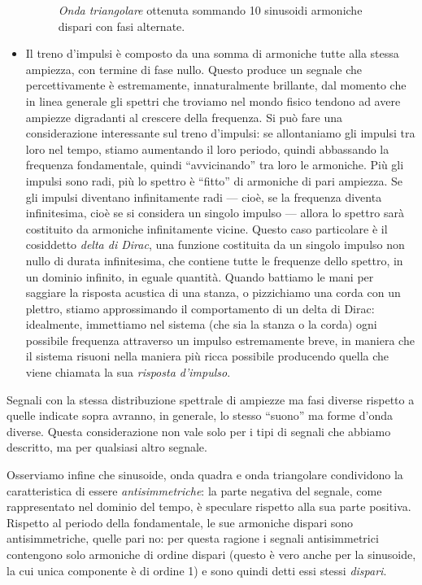 \begin{itemize}
\begin{figure}
    \begin{center}
       \scalebox{0.6} {}
    \end{center}
    \caption{\emph{Onda triangolare} ottenuta sommando 10 sinusoidi armoniche dispari con fasi alternate.}
\end{figure}

\item Il treno d'impulsi è composto da una somma di armoniche tutte alla stessa ampiezza, con termine di fase nullo. Questo produce un segnale che percettivamente è estremamente, innaturalmente brillante, dal momento che in linea generale gli spettri che troviamo nel mondo fisico tendono ad avere ampiezze digradanti al crescere della frequenza. Si può fare una considerazione interessante sul treno d'impulsi: se allontaniamo gli impulsi tra loro nel tempo, stiamo aumentando il loro periodo, quindi abbassando la frequenza fondamentale, quindi ``avvicinando'' tra loro le armoniche. Più gli impulsi sono radi, più lo spettro è ``fitto'' di armoniche di pari ampiezza. Se gli impulsi diventano infinitamente radi --- cioè, se la frequenza diventa infinitesima, cioè se si considera un singolo impulso --- allora lo spettro sarà costituito da armoniche infinitamente vicine. Questo caso particolare è il cosiddetto \emph{delta di Dirac}, una funzione costituita da un singolo impulso non nullo di durata infinitesima, che contiene tutte le frequenze dello spettro, in un dominio infinito, in eguale quantità. Quando battiamo le mani per saggiare la risposta acustica di una stanza, o pizzichiamo una corda con un plettro, stiamo approssimando il comportamento di un delta di Dirac: idealmente, immettiamo nel sistema (che sia la stanza o la corda) ogni possibile frequenza attraverso un impulso estremamente breve, in maniera che il sistema risuoni nella maniera più ricca possibile producendo quella che viene chiamata la sua \emph{risposta d'impulso}.

\end{itemize}

Segnali con la stessa distribuzione spettrale di ampiezze ma fasi diverse rispetto a quelle indicate sopra avranno, in generale, lo stesso ``suono'' ma forme d'onda diverse. Questa considerazione non vale solo per i tipi di segnali che abbiamo descritto, ma per qualsiasi altro segnale.

Osserviamo infine che sinusoide, onda quadra e onda triangolare condividono la caratteristica di essere \emph{antisimmetriche}: la parte negativa del segnale, come rappresentato nel dominio del tempo, è speculare rispetto alla sua parte positiva. Rispetto al periodo della fondamentale, le sue armoniche dispari sono antisimmetriche, quelle pari no: per questa ragione i segnali antisimmetrici contengono solo armoniche di ordine dispari (questo è vero anche per la sinusoide, la cui unica componente è di ordine 1) e sono quindi detti essi stessi \emph{dispari}.



